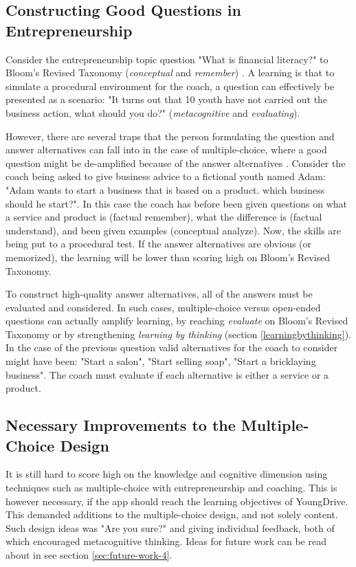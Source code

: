   \subsection{Constructing Good Questions in Entrepreneurship}

  Consider the entrepreneurship topic question "What is financial literacy?" to Bloom's Revised Taxonomy (\textit{conceptual} and \textit{remember}) \citep{krathwohl}. A learning is that to simulate a procedural environment for the coach, a question can effectively be presented as a scenario: "It turns out that 10 youth have not carried out the business action, what should you do?" (\textit{metacognitive} and \textit{evaluating}).

  However, there are several traps that the person formulating the question and answer alternatives can fall into in the case of multiple-choice, where a good question might be de-amplified because of the answer alternatives \citep{nicol}. Consider the coach being asked to give business advice to a fictional youth named Adam: "Adam wants to start a business that is based on a product. which business should he start?". In this case the coach has before been given questions on what a service and product is (factual remember), what the difference is (factual understand), and been given examples (conceptual analyze). Now, the skills are being put to a procedural test. If the answer alternatives are obvious (or memorized), the learning will be lower than scoring high on Bloom's Revised Taxonomy.

  To construct high-quality answer alternatives, all of the answers must be evaluated and considered. In such cases, multiple-choice versus open-ended questions can actually amplify learning, by reaching \textit{evaluate} on Bloom's Revised Taxonomy or by strengthening \textit{learning by thinking} (section \ref{learningbythinking}). In the case of the previous question valid alternatives for the coach to consider might have been: "Start a salon", "Start selling soap", "Start a bricklaying business". The coach must evaluate if each alternative is either a service or a product.

  \subsection{Necessary Improvements to the Multiple-Choice Design}
  It is still hard to score high on the knowledge and cognitive dimension using techniques such as multiple-choice with entrepreneurship and coaching. This is however necessary, if the app should reach the learning objectives of YoungDrive. This demanded additions to the multiple-choice design, and not solely content. Such design ideas was "Are you sure?" and giving individual feedback, both of which encouraged metacognitive thinking. Ideas for future work can be read about in see section \ref{sec:future-work-4}.

